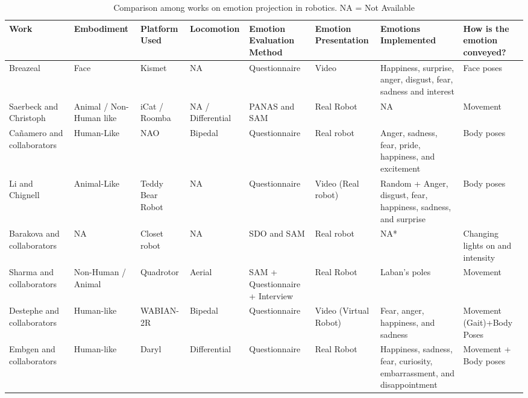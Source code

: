 \begin{table}[h]
\caption{Comparison among works on emotion projection in robotics. NA = Not Available}
\label{table:comparison_work_emotion_projection}
\begin{center}
\tiny %
\begin{tabular}{|p{2.3 cm}|p{1.5 cm}|p{1.3 cm}|p{1.4 cm}|p{1.4 cm}|p{1.0 cm}|p{2.2 cm}|p{1.4 cm}|}
\hline 
\textbf{Work}  & \textbf{Embodiment} & \textbf{Platform Used} & \textbf{Locomotion} & \textbf{Emotion Evaluation Method} & \textbf{Emotion Presentation} & \textbf{Emotions Implemented}  & \textbf{How is the emotion conveyed?}\\ 
\hline 
Breazeal~\cite{Breazeal2002}  & Face & Kismet & NA & Questionnaire & Video & Happiness, surprise, anger, disgust, fear, sadness and interest &  Face poses\\ 
\hline
Saerbeck and Christoph~\cite{Saerbeck2010} & Animal / Non-Human like& iCat / Roomba & NA / Differential &PANAS and SAM & Real Robot & NA &  Movement\\
\hline 
Ca\~namero and collaborators~\cite{Canamero2010,Beck2010}&Human-Like & NAO & Bipedal & Questionnaire & Real robot & Anger, sadness, fear, pride, happiness, and excitement &  Body poses\\
\hline
Li and Chignell~\cite{Li2011}& Animal-Like& Teddy Bear Robot& NA & Questionnaire & Video (Real robot) & Random + Anger, disgust, fear, happiness, sadness, and surprise  & Body poses\\ 
\hline
Barakova and collaborators~\cite{Barakova2013} & NA & Closet robot& NA & SDO and SAM & Real robot & NA*  & Changing lights on and intensity\\ 
\hline
Sharma and collaborators~\cite{Sharma2013} & Non-Human / Animal & Quadrotor & Aerial & SAM + Questionnaire + Interview &  Real Robot & Laban's poles & Movement\\
\hline
Destephe and collaborators~\cite{Destephe2013b}&Human-like & WABIAN-2R & Bipedal & Questionnaire & Video (Virtual Robot) & Fear, anger, happiness, and sadness & Movement (Gait)+Body Poses\\
\hline 
Embgen and collaborators~\cite{Arras2012} & Human-like & Daryl &  Differential& Questionnaire & Real Robot & Happiness, sadness, fear, curiosity, embarrassment, and disappointment & Movement + Body poses \\ 

\end{tabular}
\end{center}
\end{table}
